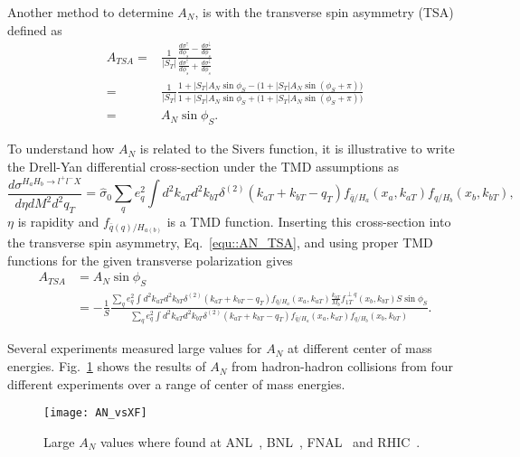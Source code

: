 Another method to determine $A_N$, is with the transverse spin asymmetry (TSA)
defined as
\begin{align}
  \label{equ::AN_TSA}
  A_{TSA} =& \frac{1}{|S_T|} \frac{\frac{d\sigma^{\uparrow}}{d\phi_s} -
    \frac{d\sigma^{\downarrow}}{d\phi_s}} {\frac{d\sigma^{\uparrow}}{d\phi_s} +
    \frac{d\sigma^{\downarrow}}{d\phi_s}} \\ \nonumber =& \frac{1}{|S_T|} \frac{1 +
    |S_T|A_N\sin\phi_S - \Big(1 + |S_T|A_N\sin(\phi_S + \pi) \Big)} {1 + |S_T|A_N\sin\phi_S
    + \Big(1 + |S_T|A_N\sin(\phi_S + \pi) \Big)} \\ \nonumber =& A_N\sin\phi_S.
\end{align}

To understand how $A_N$ is related to the Sivers function, it is illustrative to
write the Drell-Yan differential cross-section under the TMD assumptions
as~\cite{PhysRevLett.103.172001}
\begin{equation}
  \frac{d\sigma^{H_aH_b\rightarrow l^+l^- X}}{d\eta dM^2d^2q_T} =
  \hat{\sigma}_0 \sum_q e^2_q \int d^2k_{aT} d^2k_{bT}
  \delta^{(2)}(k_{aT}+k_{bT}-q_T)
  f_{\bar{q}/H_a}(x_a, k_{aT})f_{q/H_b}(x_b, k_{bT}),
\end{equation}
\noindent
 $\eta$ is rapidity and $f_{\bar{q}(q)/H_{a(b)}}$ is a TMD function.  Inserting
this cross-section into the transverse spin asymmetry, Eq.~\ref{equ::AN_TSA},
and using proper TMD functions for the given transverse polarization gives
\begin{align}
  A_{TSA} &= A_N \sin \phi_S
  \\ \nonumber
  &= -\frac{1}{S}
  \frac{\sum_q e^2_q \int d^2k_{aT} d^2k_{bT}
    \delta^{(2)}(k_{aT}+k_{bT}-q_T)f_{\bar{q}/H_a}(x_a, k_{aT})
    \frac{k_{bT}}{M_b}f_{1T}^{\perp q}(x_b, k_{bT})
    S\sin \phi_S}
  {\sum_q e^2_q \int d^2k_{aT} d^2k_{bT}
    \delta^{(2)}(k_{aT}+k_{bT}-q_T)
    f_{\bar{q}/H_a}(x_a, k_{aT})f_{q/H_b}(x_b, k_{bT})}.
\end{align}

Several experiments measured large values for $A_N$ at different center of mass
energies.  Fig.~\ref{fig::AN_vsXF} shows the results of $A_N$ from hadron-hadron
collisions from four different experiments over a range of center of mass
energies.

\begin{figure}[h!t]
  \centering
  \texttt{[image: AN\_vsXF]}
  \caption{Large $A_N$ values where found at ANL~\cite{PhysRevLett.36.929},
    BNL~\cite{PhysRevD.65.092008}, FNAL~\cite{ADAMS1991201,ADAMS1991462} and
    RHIC~\cite{PhysRevLett.101.042001}.}
  \label{fig::AN_vsXF}
\end{figure}

